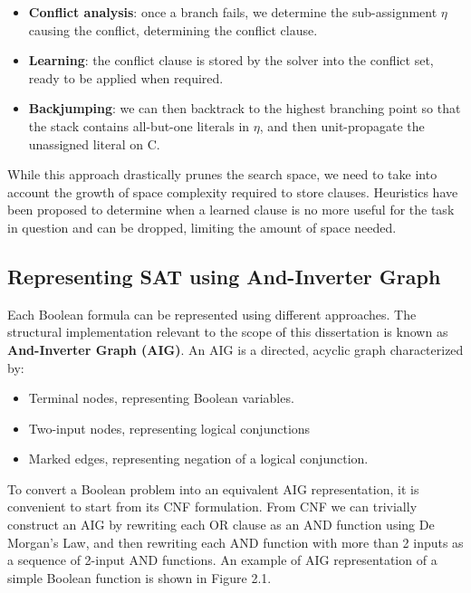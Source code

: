 \begin{itemize}
    \item \textbf{Conflict analysis}: once a branch fails, we determine the sub-assignment $\eta$ causing the conflict, determining the conflict clause.
    \item \textbf{Learning}: the conflict clause is stored by the solver into the conflict set, ready to be applied when required.
    \item \textbf{Backjumping}: we can then backtrack to the highest branching point so that the stack contains all-but-one literals in $\eta$, and then unit-propagate the unassigned literal on C.
\end{itemize}

While this approach drastically prunes the search space, we need to take into account the growth of space complexity required to store clauses. Heuristics have been proposed to determine when a learned clause is no more useful for the task in question and can be dropped, limiting the amount of space needed.

\subsection{Representing SAT using And-Inverter Graph}

Each Boolean formula can be represented using different approaches. The structural implementation relevant to the scope of this dissertation is known as \textbf{And-Inverter Graph (AIG)}. An AIG is a directed, acyclic graph characterized by:

\begin{itemize}
    \item Terminal nodes, representing Boolean variables.
    \item Two-input nodes, representing logical conjunctions
    \item Marked edges, representing negation of a logical conjunction.
\end{itemize}

To convert a Boolean problem into an equivalent AIG representation, it is convenient to start from its CNF formulation. From CNF we can trivially construct an AIG by rewriting each OR clause as an AND function using De Morgan’s Law, and then rewriting each AND function with more than 2 inputs as a sequence of 2-input AND functions. An example of AIG representation of a simple Boolean function is shown in Figure 2.1. 

